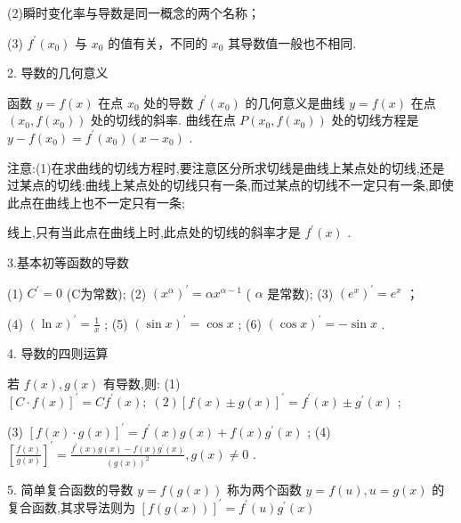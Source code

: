 \documentclass[10pt]{article}
\begin{document}
(2)瞬时变化率与导数是同一概念的两个名称；

(3) \({f}^{\prime }\left( {x}_{0}\right)\) 与 \({x}_{0}\) 的值有关，不同的 \({x}_{0}\) 其导数值一般也不相同.

2. 导数的几何意义

函数 \(y = f\left( x\right)\) 在点 \({x}_{0}\) 处的导数 \({f}^{\prime }\left( {x}_{0}\right)\) 的几何意义是曲线 \(y = f\left( x\right)\) 在点 \(\left( {{x}_{0},f\left( {x}_{0}\right) }\right)\) 处的切线的斜率. 曲线在点 \(P\left( {{x}_{0},f\left( {x}_{0}\right) }\right)\) 处的切线方程是 \(y - f\left( {x}_{0}\right)  = {f}^{\prime }\left( {x}_{0}\right) \left( {x - {x}_{0}}\right)\) .

注意:(1)在求曲线的切线方程时,要注意区分所求切线是曲线上某点处的切线,还是过某点的切线:曲线上某点处的切线只有一条,而过某点的切线不一定只有一条,即使此点在曲线上也不一定只有一条;

线上,只有当此点在曲线上时,此点处的切线的斜率才是 \({f}^{\prime }\left( x\right)\) .

3.基本初等函数的导数

(1) \({C}^{\prime } = 0\) (C为常数); (2) \({\left( {x}^{\alpha }\right) }^{\prime } = \alpha {x}^{\alpha  - 1}\) ( \(\alpha\) 是常数); (3) \({\left( {e}^{x}\right) }^{\prime } = {e}^{x}\) ；

(4) \({\left( \ln x\right) }^{\prime } = \frac{1}{x}\) ; (5) \({\left( \sin x\right) }^{\prime } = \cos x\) ; (6) \({\left( \cos x\right) }^{\prime } =  - \sin x\) .

4. 导数的四则运算

若 \(f\left( x\right) ,g\left( x\right)\) 有导数,则: (1) \({\left\lbrack  C \cdot  f\left( x\right) \right\rbrack  }^{\prime } = C{f}^{\prime }\left( x\right) ;\;\left( 2\right) {\left\lbrack  f\left( x\right)  \pm  g\left( x\right) \right\rbrack  }^{\prime } = {f}^{\prime }\left( x\right)  \pm  {g}^{\prime }\left( x\right)\) ;

(3) \({\left\lbrack  f\left( x\right)  \cdot  g\left( x\right) \right\rbrack  }^{\prime } = {f}^{\prime }\left( x\right) g\left( x\right)  + f\left( x\right) {g}^{\prime }\left( x\right)\) ; (4) \({\left\lbrack  \frac{f\left( x\right) }{g\left( x\right) }\right\rbrack  }^{\prime } = \frac{{f}^{\prime }\left( x\right) g\left( x\right)  - f\left( x\right) {g}^{\prime }\left( x\right) }{{\left( g\left( x\right) \right) }^{2}},g\left( x\right)  \neq  0\) .

5. 简单复合函数的导数 \(y = f\left( {g\left( x\right) }\right)\) 称为两个函数 \(y = f\left( u\right) ,u = g\left( x\right)\) 的复合函数,其求导法则为 \({\left\lbrack  f\left( g\left( x\right) \right) \right\rbrack  }^{\prime } = {f}^{\prime }\left( u\right) {g}^{\prime }\left( x\right)\)
\end{document}
